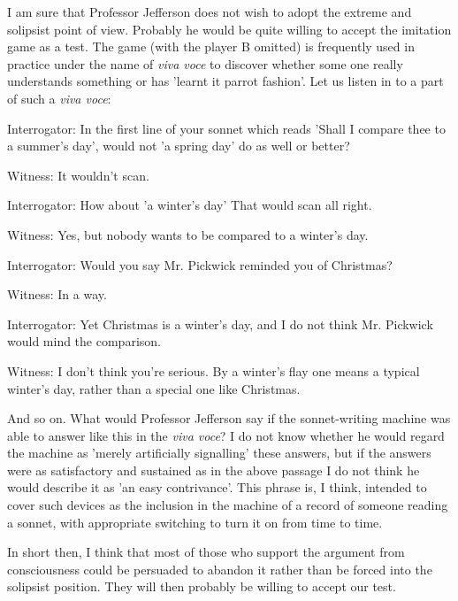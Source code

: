 \documentclass[12pt]{article}
\begin{document}
    I am sure that Professor Jefferson does not wish to adopt the extreme and solipsist point of view. Probably he would be quite willing to accept the imitation game as a test. The game (with the player B omitted) is frequently used in practice under the name of \textit{viva voce} to discover whether some one really understands something or has 'learnt it parrot fashion'. Let us listen in to a part of such a \textit{viva voce}:
    \vspace{\baselineskip}

    \begin{hangparas}{3em}{1}
        Interrogator: In the first line of your sonnet which reads 'Shall I compare thee to a summer's day', would not 'a spring day' do as well or better?

        Witness: It wouldn't scan.

        Interrogator: How about 'a winter's day' That would scan all right.

        Witness: Yes, but nobody wants to be compared to a winter's day.

        Interrogator: Would you say Mr. Pickwick reminded you of Christmas?

        Witness: In a way.

        Interrogator: Yet Christmas is a winter's day, and I do not think Mr. Pickwick would mind the comparison.

        Witness: I don't think you're serious. By a winter's flay one means a typical winter's day, rather than a special one like Christmas.
    \end{hangparas}
    \vspace{\baselineskip}

    And so on. What would Professor Jefferson say if the sonnet-writing machine was able to answer like this in the \textit{viva voce}? I do not know whether he would regard the machine as 'merely artificially signalling' these answers, but if the answers were as satisfactory and sustained as in the above passage I do not think he would describe it as 'an easy contrivance'. This phrase is, I think, intended to cover such devices as the inclusion in the machine of a record of someone reading a sonnet, with appropriate switching to turn it on from time to time.

    In short then, I think that most of those who support the argument from consciousness could be persuaded to abandon it rather than be forced into the solipsist position. They will then probably be willing to accept our test.
\end{document}
